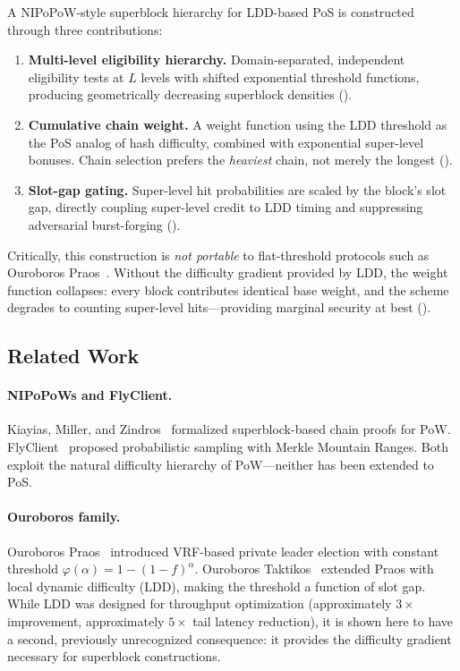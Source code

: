 \documentclass[11pt]{article}
\newcommand{\stake}{\alpha}
\newcommand{\threshold}{\varphi}
\begin{document}
A NIPoPoW-style superblock hierarchy for LDD-based PoS is constructed through three contributions:

\begin{enumerate}
    \item \textbf{Multi-level eligibility hierarchy.} Domain-separated, independent eligibility tests at $L$ levels with shifted exponential threshold functions, producing geometrically decreasing superblock densities ().
    \item \textbf{Cumulative chain weight.} A weight function using the LDD threshold as the PoS analog of hash difficulty, combined with exponential super-level bonuses. Chain selection prefers the \emph{heaviest} chain, not merely the longest ().
    \item \textbf{Slot-gap gating.} Super-level hit probabilities are scaled by the block's slot gap, directly coupling super-level credit to LDD timing and suppressing adversarial burst-forging ().
\end{enumerate}

Critically, this construction is \emph{not portable} to flat-threshold protocols such as Ouroboros Praos~\cite{praos}. Without the difficulty gradient provided by LDD, the weight function collapses: every block contributes identical base weight, and the scheme degrades to counting super-level hits---providing marginal security at best ().

\subsection{Related Work}

\paragraph{NIPoPoWs and FlyClient.} Kiayias, Miller, and Zindros~\cite{nipopows} formalized superblock-based chain proofs for PoW. FlyClient~\cite{flyclient} proposed probabilistic sampling with Merkle Mountain Ranges. Both exploit the natural difficulty hierarchy of PoW---neither has been extended to PoS.

\paragraph{Ouroboros family.} Ouroboros Praos~\cite{praos} introduced VRF-based private leader election with constant threshold $\threshold(\stake) = 1 - (1 - f)^\stake$. Ouroboros Taktikos~\cite{taktikos} extended Praos with local dynamic difficulty (LDD), making the threshold a function of slot gap. While LDD was designed for throughput optimization (approximately $3\times$ improvement, approximately $5\times$ tail latency reduction), it is shown here to have a second, previously unrecognized consequence: it provides the difficulty gradient necessary for superblock constructions.
\end{document}
